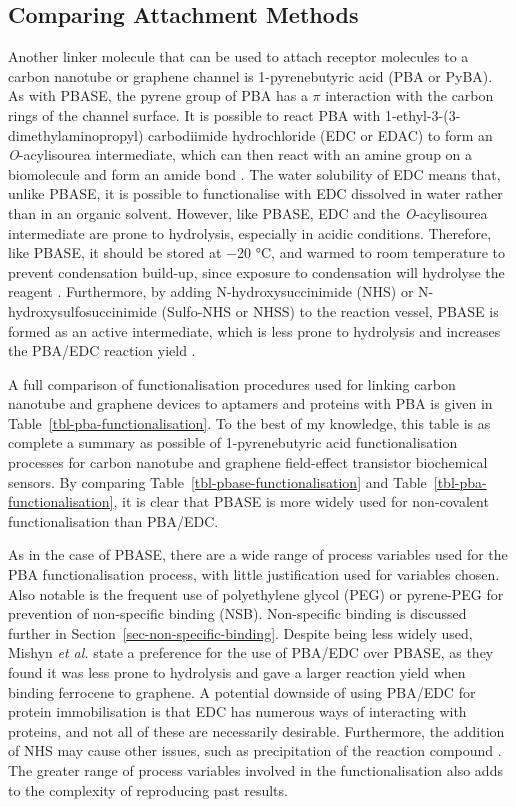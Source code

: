 \documentclass[
  a4paper,
]{scrbook}
\begin{document}
\hypertarget{comparing-attachment-methods}{%
\subsection{Comparing Attachment
Methods}\label{comparing-attachment-methods}}

Another linker molecule that can be used to attach receptor molecules to
a carbon nanotube or graphene channel is 1-pyrenebutyric acid (PBA or
PyBA). As with PBASE, the pyrene group of PBA has a \(\pi\) interaction
with the carbon rings of the channel surface. It is possible to react
PBA with 1-ethyl-3-(3-dimethylaminopropyl) carbodiimide hydrochloride
(EDC or EDAC) to form an \emph{O}-acylisourea intermediate, which can
then react with an amine group on a biomolecule and form an amide bond
\autocite{Sehgal1994,Hermanson2013-4}. The water solubility of EDC means
that, unlike PBASE, it is possible to functionalise with EDC dissolved
in water rather than in an organic solvent. However, like PBASE, EDC and
the \emph{O}-acylisourea intermediate are prone to hydrolysis,
especially in acidic conditions. Therefore, like PBASE, it should be
stored at −20 °C, and warmed to room temperature to prevent condensation
build-up, since exposure to condensation will hydrolyse the reagent
\autocite{Hermanson2013-4}. Furthermore, by adding N-hydroxysuccinimide
(NHS) or N-hydroxysulfosuccinimide (Sulfo-NHS or NHSS) to the reaction
vessel, PBASE is formed as an active intermediate, which is less prone
to hydrolysis and increases the PBA/EDC reaction yield
\autocite{Sehgal1994,Hermanson2013-4,Hermanson2013-14}.

A full comparison of functionalisation procedures used for linking
carbon nanotube and graphene devices to aptamers and proteins with PBA
is given in Table~\ref{tbl-pba-functionalisation}. To the best of my
knowledge, this table is as complete a summary as possible of
1-pyrenebutyric acid functionalisation processes for carbon nanotube and
graphene field-effect transistor biochemical sensors. By comparing
Table~\ref{tbl-pbase-functionalisation} and
Table~\ref{tbl-pba-functionalisation}, it is clear that PBASE is more
widely used for non-covalent functionalisation than PBA/EDC.

As in the case of PBASE, there are a wide range of process variables
used for the PBA functionalisation process, with little justification
used for variables chosen. Also notable is the frequent use of
polyethylene glycol (PEG) or pyrene-PEG for prevention of non-specific
binding (NSB). Non-specific binding is discussed further in
Section~\ref{sec-non-specific-binding}. Despite being less widely used,
Mishyn \emph{et al.} \autocite{Mishyn2022} state a preference for the
use of PBA/EDC over PBASE, as they found it was less prone to hydrolysis
and gave a larger reaction yield when binding ferrocene to graphene. A
potential downside of using PBA/EDC for protein immobilisation is that
EDC has numerous ways of interacting with proteins, and not all of these
are necessarily desirable. Furthermore, the addition of NHS may cause
other issues, such as precipitation of the reaction compound
\autocite{Hermanson2013-4}. The greater range of process variables
involved in the functionalisation also adds to the complexity of
reproducing past results.
\end{document}
